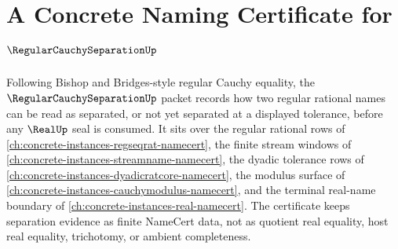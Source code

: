 \chapter{A Concrete Naming Certificate for $\RegularCauchySeparationUp$}
\label{ch:concrete-instances-regularcauchyseparation-namecert}

Following Bishop and Bridges-style regular Cauchy equality, the $\RegularCauchySeparationUp$ packet records how two regular rational names can be read as separated, or not yet separated at a displayed tolerance, before any $\RealUp$ seal is consumed. It sits over the regular rational rows of \autoref{ch:concrete-instances-regseqrat-namecert}, the finite stream windows of \autoref{ch:concrete-instances-streamname-namecert}, the dyadic tolerance rows of \autoref{ch:concrete-instances-dyadicratcore-namecert}, the modulus surface of \autoref{ch:concrete-instances-cauchymodulus-namecert}, and the terminal real-name boundary of \autoref{ch:concrete-instances-real-namecert}. The certificate keeps separation evidence as finite NameCert data, not as quotient real equality, host real equality, trichotomy, or ambient completeness.


